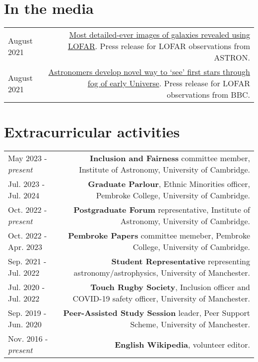 \documentclass{article}
\begin{document}
\section*{In the media}

\begin{tabular}{L!{\vrule}R}
	August 2021 & \href{https://www.astron.nl/most-detailed-ever-images-of-galaxies-revealed-using-lofar }{Most detailed-ever images of galaxies revealed using LOFAR}. Press release for LOFAR observations from ASTRON. \\
	August 2021 & \href{https://www.bbc.co.uk/news/science-environment-57998940}{Astronomers develop novel way to `see' first stars through fog of early Universe}. Press release for LOFAR observations from BBC. \\
\end{tabular}

\section*{Extracurricular activities}
\begin{tabular}{L!{\vrule}R}

  May 2023 - \textit{present} & \textbf{Inclusion and Fairness} committee member, Institute of Astronomy, University of Cambridge. \\

  Jul. 2023 - Jul. 2024 & \textbf{Graduate Parlour}, Ethnic Minorities officer, Pembroke College, University of Cambridge. \\

  Oct. 2022 - \textit{present} & \textbf{Postgraduate Forum} representative, Institute of Astronomy, University of Cambridge. \\

  Oct. 2022 - Apr. 2023 & \textbf{Pembroke Papers} committee memeber, Pembroke College, University of Cambridge. \\

  Sep. 2021 - Jul. 2022 & \textbf{Student Representative} representing astronomy/astrophysics, University of Manchester. \\

  Jul. 2020 - Jul. 2022 & \textbf{Touch Rugby Society}, Inclusion officer and COVID-19 safety officer, University of Manchester. \\

	Sep. 2019 - Jun. 2020 & \textbf{Peer-Assisted Study Session} leader, Peer Support Scheme, University of Manchester. \\

	Nov. 2016 - \textit{present} & \textbf{English Wikipedia}, volunteer editor. \\
\end{tabular}
\end{document}
